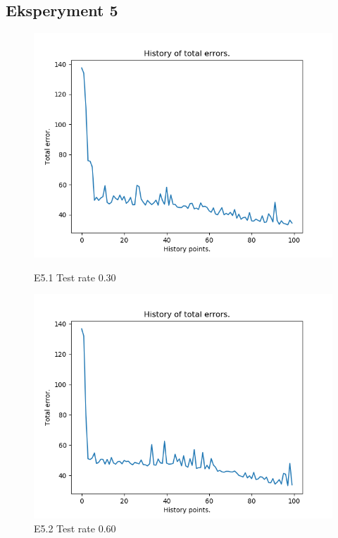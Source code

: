\documentclass{classrep}
\begin{document}
	\subsection{Eksperyment 5}
		\begin{figure}[H]
			\begin{minipage}{0.5\linewidth}
				\centering
				\includegraphics[scale=0.25]{seeds_nn_l2.png}
				\caption{E5.1 Test rate  0.30}
			\end{minipage}
			\begin{minipage}{0.5\linewidth}
				\centering
				\includegraphics[scale=0.25]{seeds_nn_l5.png}
				\caption{E5.2 Test rate  0.60}
				\label{E5.2}
			\end{minipage}
			\begin{minipage}{0.5\linewidth}

\end{minipage}
\end{figure}
\end{document}
